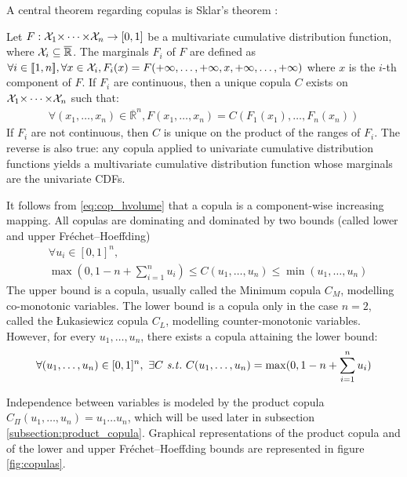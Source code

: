 A central theorem regarding copulas is Sklar's theorem \cite{sklar_fonctions_1959}:
\begin{theorem}\label{theorem:sklar}
    Let $F:{\mathcal{X}}_1{\times\dots\times}{\mathcal{X}}_n\rightarrow[0,1]$ be a multivariate cumulative distribution function, where ${\mathcal{X}}_i\subseteq\overline{\mathbb{R}}$. The marginals $F_i$ of $F$ are defined as $\forall i\in{[\![} 1,n{]\!]} , \forall x\in{\mathcal{X}}_i, F_i(x) = F( +\infty, \dots,  +\infty, x,  +\infty, \dots, +\infty)$ where $x$ is the $i$-th component of $F$. If $F_i$ are continuous, then a unique copula $C$ exists on ${\mathcal{X}}_1{\times\dots\times}{\mathcal{X}}_n$ such that:
    \begin{eqnarray}
        \forall (x_1,\dots,x_n)\in \overline{\mathbb{R}}^n, F(x_1,\dots,x_n)=C(F_1(x_1),\dots, F_n(x_n))
    \end{eqnarray}
    If $F_i$ are not continuous, then $C$ is unique on the product of the ranges of $F_i$.
    The reverse is also true: any copula applied to univariate cumulative distribution functions yields a multivariate cumulative distribution function whose marginals are the univariate CDFs.
\end{theorem}

It follows from \eqref{eq:cop_hvolume} that a copula is a component-wise increasing mapping. All copulas are dominating and dominated by two bounds (called lower and upper Fréchet–Hoeffding)
\begin{align}
    &\forall u_i \in [0,1]^n,\nonumber\\
    &\max(0, 1-n+\sum_{i=1}^n u_i) \leqslant C(u_1,\dots,u_n) \leqslant \min(u_1, \dots, u_n)
\end{align}
The upper bound is a copula, usually called the Minimum copula $C_M$, modelling co-monotonic variables. The lower bound is a copula only in the case $n=2$, called the \L ukasiewicz copula $C_L$, modelling counter-monotonic variables. However, for every $u_1,\dots,u_n$, there exists a copula attaining the lower bound:
\begin{eqnarray*}
    \forall (u_1,\dots,u_n)\in[0,1]^n,~\exists C \text{ \st }~C(u_1,\dots,u_n) = \max(0, 1-n+\sum_{i=1}^n u_i)
\end{eqnarray*}

Independence between variables is modeled by the product copula $C_\Pi(u_1, \dots, u_n)=u_1\dots u_n$, which will be used later in subsection \ref{subsection:product_copula}. Graphical representations of the product copula and of the lower and upper Fréchet–Hoeffding bounds are represented in figure \ref{fig:copulas}. 

